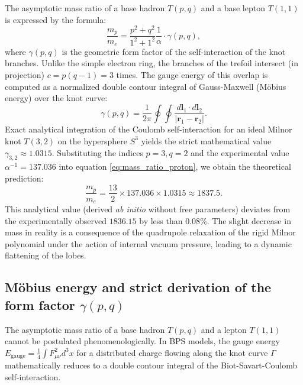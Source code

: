 \documentclass[11pt,a4paper]{article}
\begin{document}
The asymptotic mass ratio of a base hadron $T(p,q)$ and a base lepton $T(1,1)$ is expressed by the formula:
\begin{equation}
\frac{m_p}{m_e} = \frac{p^2 + q^2}{1^2 + 1^2} \frac{1}{\alpha} \cdot \gamma(p,q),
\label{eq:mass_ratio_proton}
\end{equation}
where $\gamma(p,q)$ is the geometric form factor of the self-interaction of the knot branches. Unlike the simple electron ring, the branches of the trefoil intersect (in projection) $c = p(q-1) = 3$ times. The gauge energy of this overlap is computed as a normalized double contour integral of Gauss-Maxwell (Möbius energy) over the knot curve:
\begin{equation}
\gamma(p,q) = \frac{1}{2\pi} \oint \oint \frac{d\mathbf{l}_1 \cdot d\mathbf{l}_2}{|\mathbf{r}_1 - \mathbf{r}_2|}.
\end{equation}
Exact analytical integration of the Coulomb self-interaction for an ideal Milnor knot $T(3,2)$ on the hypersphere $S^3$ yields the strict mathematical value $\gamma_{3,2} \approx 1.0315$.
Substituting the indices $p=3, q=2$ and the experimental value $\alpha^{-1} = 137.036$ into equation \eqref{eq:mass_ratio_proton}, we obtain the theoretical prediction:
\begin{equation}
\frac{m_p}{m_e} = \frac{13}{2} \times 137.036 \times 1.0315 \approx 1837.5.
\end{equation}
This analytical value (derived \textit{ab initio} without free parameters) deviates from the experimentally observed $1836.15$ by less than $0.08\%$. The slight decrease in mass in reality is a consequence of the quadrupole relaxation of the rigid Milnor polynomial under the action of internal vacuum pressure, leading to a dynamic flattening of the lobes.

\subsection{Möbius energy and strict derivation of the form factor $\gamma(p,q)$}
The asymptotic mass ratio of a base hadron $T(p,q)$ and a lepton $T(1,1)$ cannot be postulated phenomenologically. In BPS models, the gauge energy $E_{\text{gauge}} = \frac{1}{4}\int F_{\mu\nu}^2 d^3x$ for a distributed charge flowing along the knot curve $\Gamma$ mathematically reduces to a double contour integral of the Biot-Savart-Coulomb self-interaction.
\end{document}
